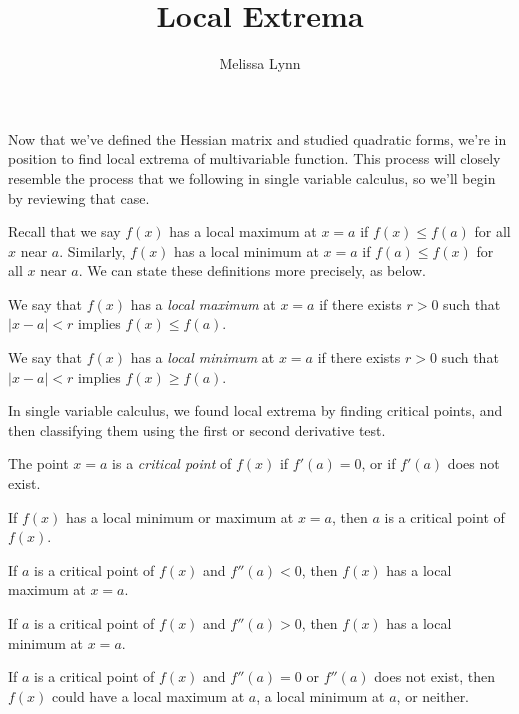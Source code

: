 \documentclass{ximera}
\title{Local Extrema}
\author{Melissa Lynn}
\begin{document}
\begin{abstract}
\end{abstract}
\maketitle

Now that we've defined the Hessian matrix and studied quadratic forms, we're in position to find local extrema of multivariable function. This process will closely resemble the process that we following in single variable calculus, so we'll begin by reviewing that case.

Recall that we say $f(x)$ has a local maximum at $x=a$ if $f(x)\leq f(a)$ for all $x$ near $a$. Similarly, $f(x)$ has a local minimum at $x=a$ if $f(a)\leq f(x)$ for all $x$ near $a$. We can state these definitions more precisely, as below.

\begin{definition}
We say that $f(x)$ has a \emph{local maximum} at $x=a$ if there exists $r>0$ such that $|x-a|<r$ implies $f(x)\leq f(a)$.

We say that $f(x)$ has a \emph{local minimum} at $x=a$ if there exists $r>0$ such that $|x-a|<r$ implies $f(x)\geq f(a)$.
\end{definition}

In single variable calculus, we found local extrema by finding critical points, and then classifying them using the first or second derivative test.

\begin{definition}
The point $x=a$ is a \emph{critical point} of $f(x)$ if $f'(a)=0$, or if $f'(a)$ does not exist.
\end{definition}

\begin{proposition}
If $f(x)$ has a local minimum or maximum at $x=a$, then $a$ is a critical point of $f(x)$.

If $a$ is a critical point of $f(x)$ and $f''(a)<0$, then $f(x)$ has a local maximum at $x=a$.

If $a$ is a critical point of $f(x)$ and $f''(a)>0$, then $f(x)$ has a local minimum at $x=a$.

If $a$ is a critical point of $f(x)$ and $f''(a)=0$ or $f''(a)$ does not exist, then $f(x)$ could have a local maximum at $a$, a local minimum at $a$, or neither.
\end{proposition}
\end{document}

